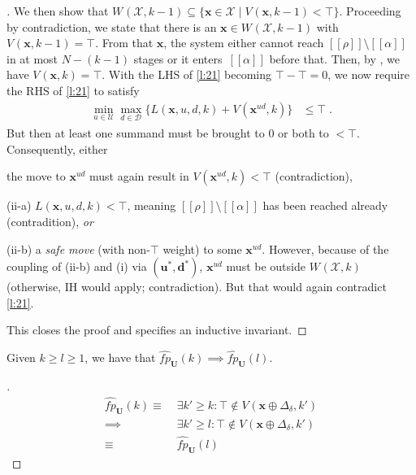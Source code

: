 \documentclass{article}
\newcommand\mkYcAoM[1][]{\mathcal{D}_{#1}}
\newcommand\mpBykPY[1][]{\mathcal{U}_{#1}}
\newcommand\mcrHMQW[1]{[\![#1]\!]}
\newcommand\mijCQyI[1][]{V^{#1}}
\renewcommand\vec[1]{\mathbf{#1}}
\newcommand\mDpbDSN[1][]{W^{#1}}
\newcommand\mBuHESu[1][\delta]{\Delta_{#1}}
\begin{document}
{\begin{proof}[]
  We then show that
  $\mDpbDSN(\mathcal{X},k-1)
  \subseteq
  \{{\vec{x}}\in\mathcal{X}\mid
  \mijCQyI({\vec{x}},k-1)<\top\}$.
  Proceeding by contradiction, we state that there is an
  ${\vec{x}}\in \mDpbDSN(\mathcal{X},k-1)$ with
  $\mijCQyI({\vec{x}},k-1)=\top$.  From that
  ${\vec{x}}$, the system either cannot reach
  $\mcrHMQW\rho\setminus\mcrHMQW\alpha$ in at most
  $N-(k-1)$ stages or it
  enters~$\mcrHMQW\alpha$ before that.
  Then, by , we have
  $\mijCQyI({\vec{x}},k)=\top$. 
  With the LHS of \eqref{l:21} becoming
  $\top-\top=0$, we now require the RHS of
  \eqref{l:21} to satisfy
  \begin{align*}
    \min_{u\in\mpBykPY}
    \max_{d\in\mkYcAoM}
    \big\{
    L({\vec{x}},u,d,k)%
    +
    \mijCQyI({\vec{x}}^{ud},k)
    \big\}
    & \leq\top\;.
  \end{align*}
  But then at least one summand must be brought to $0$ or both to
  $<\top$.  Consequently, either
  \begin{inparaenum}[(i)]
  \item the move to
    ${\vec{x}}^{ud}$ must again result in
    $\mijCQyI({\vec{x}}^{ud},k)<\top$
    (contradiction),
  \item[(ii-a)]
    $L({\vec{x}},u,d,k)%
    <\top$, meaning $\mcrHMQW\rho\setminus\mcrHMQW\alpha$ has
    been reached already (contradition), \emph{or}
  \item[(ii-b)] a \emph{safe move} (with non-$\top$ weight) to
    some ${\vec{x}}^{ud}$.  However, because
    of the coupling of (ii-b) and (i) via $({\vec{u}}^*,{\vec{d}}^*)$,
    ${\vec{x}}^{ud}$ must be outside
    $\mDpbDSN(\mathcal{X},k)$
    (otherwise, IH would apply; contradiction).  But that would
    again contradict \eqref{l:21}.
  \end{inparaenum}
  
  This closes the proof and 
  specifies an inductive invariant.
\end{proof}

\begin{lemma}
  \label{l:30}
  Given $k\geq l\geq1$, we have that
  $\widehat{\mathit{fp}}_{\vec{U}}(k) \implies
  \widehat{\mathit{fp}}_{\vec{U}}(l)$.
\end{lemma}

\begin{proof}[]
  \begin{align*}
    \widehat{\mathit{fp}}_{\vec{U}}(k)
    \equiv\;
    & \exists k'\geq k\colon
      \top\not\in\mijCQyI({\vec{x}}\oplus\mBuHESu,k')
      \tag{by def}
    \\\implies
    & \exists k'\geq l\colon
      \top\not\in\mijCQyI({\vec{x}}\oplus\mBuHESu,k')
      \tag{by assumption}
    \\\equiv\;
    & \widehat{\mathit{fp}}_{\vec{U}}(l)
  \end{align*}
\end{proof}

}
\end{document}
